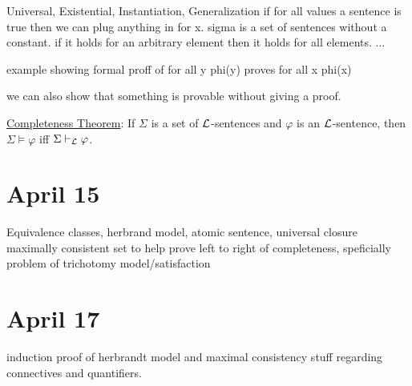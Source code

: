 \documentclass[11pt]{amsart}
\begin{document}
    Universal, Existential, Instantiation, Generalization
    if for all values a sentence is true then we can plug anything in for x.
    sigma is a set of sentences without a constant. if it holds for an arbitrary element then it holds for all elements.
    ...

    example showing formal proff of for all y phi(y) proves for all x phi(x)

    we can also show that something is provable without giving a proof.

    \underline{Completeness Theorem}: If $\Sigma$ is a set of $\mathcal{L}$-sentences and $\varphi$ is an $\mathcal{L}$-sentence, then $\Sigma \models \varphi$ iff $\Sigma \vdash_{\mathcal{L}} \varphi$.

    \section{April 15}
    Equivalence classes, herbrand model, atomic sentence, universal closure \\

    maximally consistent set to help prove left to right of completeness, speficially problem of trichotomy model/satisfaction

    \section{April 17}
    induction proof of herbrandt model and maximal consistency stuff regarding connectives and quantifiers.
\end{document}
